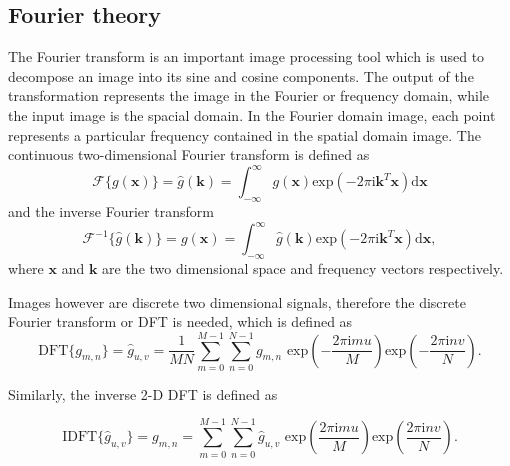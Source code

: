 		\subsection{Fourier theory}
		The Fourier transform is an important image processing tool which is used to decompose an image into its sine and cosine components. The output of the transformation represents the image in the Fourier or frequency domain, while the input image is the spacial domain. In the Fourier domain image, each point represents a particular frequency contained in the spatial domain image.
		The continuous two-dimensional Fourier transform is defined as
		\begin{equation}
				\mathscr{F}\{ g(\mathbf{x})  \} = \hat{g}(\mathbf{k}) = 
				\int_{-\infty}^{\infty} g(\mathbf{x}) \text{exp}\left( -2 \pi \text{i} \mathbf{k}^T \mathbf{x}  \right) \text{d}\mathbf{x}
		\end{equation}
		and the inverse Fourier transform
		\begin{equation}
				\mathscr{F}^{-1}\{ \hat{g}(\mathbf{k}) \} = g(\mathbf{x}) =
				 \int_{-\infty}^{\infty} \hat{g}(\mathbf{k})
			\text{exp}\left( -2 \pi \text{i} \mathbf{k}^T \mathbf{x}  \right) \text{d}\mathbf{x},
		\end{equation}
		where $\mathbf{x}$ and $\mathbf{k}$  are the two dimensional space and frequency vectors respectively. 
		
		Images however are discrete two dimensional signals, therefore the discrete Fourier transform or DFT is needed, which is defined as
		\begin{equation}
			\text{DFT}\{ g_{m,n} \} = \hat{g}_{u,v} = \dfrac{1}{MN} \sum_{m=0}^{M-1} \sum_{n=0}^{N-1}
			g_{m,n} \text{ exp} \left(  - \dfrac{2 \pi \text{i} m u}{M}  \right)
						\text{exp} \left(  - \dfrac{2 \pi \text{i} n v}{N}  \right).
		\end{equation}		 

		Similarly, the inverse 2-D DFT is defined as 
		
		\begin{equation}
		 \text{IDFT}\{\hat{g}_{u,v}\} = g_{m,n} = \sum_{m=0}^{M-1} \sum_{n=0}^{N-1} \hat{g}_{u,v}
			\text{ exp} \left(   \dfrac{2 \pi \text{i} m u}{M}  \right)
			\text{exp} \left(   \dfrac{2 \pi \text{i} n v}{N}  \right).
		\end{equation}
		
		
